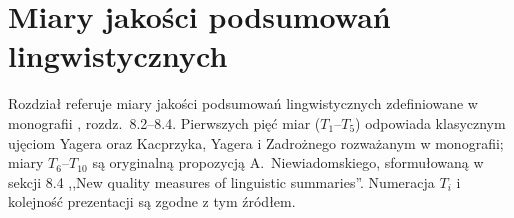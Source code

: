 %
%

\section*{Miary jakości podsumowań lingwistycznych}

Rozdział referuje miary jakości podsumowań lingwistycznych zdefiniowane
w monografii \cite{niewiadomski2008}, rozdz.~8.2--8.4. Pierwszych pięć
miar ($T_1$--$T_5$) odpowiada klasycznym ujęciom Yagera oraz Kacprzyka,
Yagera i Zadrożnego rozważanym w monografii; miary $T_6$--$T_{10}$ są
oryginalną propozycją A.~Niewiadomskiego, sformułowaną w sekcji 8.4
,,New quality measures of linguistic summaries''. Numeracja $T_i$
i kolejność prezentacji są zgodne z tym źródłem.

